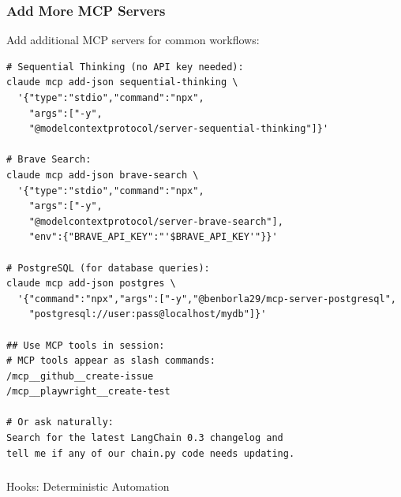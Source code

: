 \begin{frame}[fragile]\frametitle{Add More MCP Servers}
Add additional MCP servers for common workflows:

\begin{lstlisting}
# Sequential Thinking (no API key needed):
claude mcp add-json sequential-thinking \
  '{"type":"stdio","command":"npx",
    "args":["-y",
    "@modelcontextprotocol/server-sequential-thinking"]}'

# Brave Search:
claude mcp add-json brave-search \
  '{"type":"stdio","command":"npx",
    "args":["-y",
    "@modelcontextprotocol/server-brave-search"],
    "env":{"BRAVE_API_KEY":"'$BRAVE_API_KEY'"}}'

# PostgreSQL (for database queries):
claude mcp add-json postgres \
  '{"command":"npx","args":["-y","@benborla29/mcp-server-postgresql",
    "postgresql://user:pass@localhost/mydb"]}'

## Use MCP tools in session:
# MCP tools appear as slash commands:
/mcp__github__create-issue
/mcp__playwright__create-test

# Or ask naturally:
Search for the latest LangChain 0.3 changelog and
tell me if any of our chain.py code needs updating.
\end{lstlisting}
\end{frame}


\begin{frame}[fragile]\frametitle{}
\begin{center}
{\Large Hooks: Deterministic Automation}

\end{center}
\end{frame}


